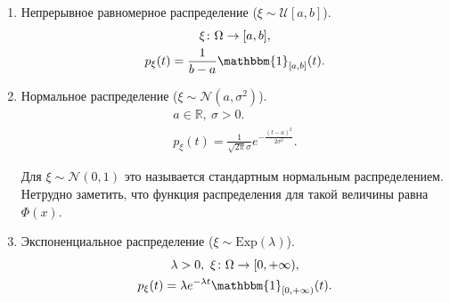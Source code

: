 \begin{examples}
\begin{enumerate}
            \item Непрерывное равномерное распределение ($\xi \sim \mathcal{U}[a, b]$).
            \begin{gather*}
                \xi \colon \Omega\rightarrow [a, b],\\
                p_\xi (t) = \frac{1}{b - a}\mathbbm{1}_{[a, b]}(t).
            \end{gather*}
   
            \item Нормальное распределение ($\xi\sim \mathcal{N}(a, \sigma^2)$).
            \begin{gather*}
                a\in\mathbb{R}, \ \sigma > 0.\\
                p_\xi (t) = \frac{1}{\sqrt{2\pi}\sigma} e^{-\frac{(t-a)^2}{2\sigma^2}}.
            \end{gather*}
   
                  Для $\xi\sim\mathcal{N}(0, 1)$ это называется стандартным нормальным распределением. Нетрудно заметить, что функция распределения для такой величины равна $\Phi(x)$.
   
            \item Экспоненциальное распределение ($\xi\sim \text{Exp}(\lambda)$).
            \begin{gather*}
                \lambda > 0, \ \xi \colon \Omega \rightarrow [0, +\infty), \\
                p_\xi (t) =\lambda e^{-\lambda t}\mathbbm{1}_{[0, +\infty)}(t).
            \end{gather*}
        \end{enumerate}
    \end{examples}
   
   